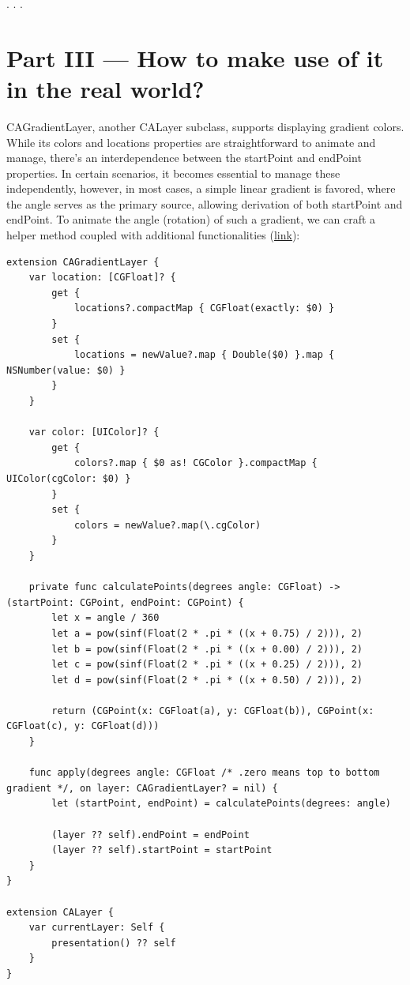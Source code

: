 \documentclass{article}
\newcommand{\separator}{\vspace{5mm}\centerline{. . .}\vspace{5mm}}
\begin{document}
\separator

\section{Part III — How to make use of it in the real world?}
\label{sec:part3}

CAGradientLayer, another CALayer subclass, supports displaying gradient colors. While its colors and locations properties are straightforward to animate and manage, there's an interdependence between the startPoint and endPoint properties. In certain scenarios, it becomes essential to manage these independently, however, in most cases, a simple linear gradient is favored, where the angle serves as the primary source, allowing derivation of both startPoint and endPoint. To animate the angle (rotation) of such a gradient, we can craft a helper method coupled with additional functionalities (\href{https://github.com/stateman92/Medium-AnimatableProperties/commit/bc084166a2b3561ae57c34aa416aa75ced12e745}{link}):

\begin{lstlisting}
extension CAGradientLayer {
    var location: [CGFloat]? {
        get {
            locations?.compactMap { CGFloat(exactly: $0) }
        }
        set {
            locations = newValue?.map { Double($0) }.map { NSNumber(value: $0) }
        }
    }

    var color: [UIColor]? {
        get {
            colors?.map { $0 as! CGColor }.compactMap { UIColor(cgColor: $0) }
        }
        set {
            colors = newValue?.map(\.cgColor)
        }
    }

    private func calculatePoints(degrees angle: CGFloat) -> (startPoint: CGPoint, endPoint: CGPoint) {
        let x = angle / 360
        let a = pow(sinf(Float(2 * .pi * ((x + 0.75) / 2))), 2)
        let b = pow(sinf(Float(2 * .pi * ((x + 0.00) / 2))), 2)
        let c = pow(sinf(Float(2 * .pi * ((x + 0.25) / 2))), 2)
        let d = pow(sinf(Float(2 * .pi * ((x + 0.50) / 2))), 2)

        return (CGPoint(x: CGFloat(a), y: CGFloat(b)), CGPoint(x: CGFloat(c), y: CGFloat(d)))
    }

    func apply(degrees angle: CGFloat /* .zero means top to bottom gradient */, on layer: CAGradientLayer? = nil) {
        let (startPoint, endPoint) = calculatePoints(degrees: angle)

        (layer ?? self).endPoint = endPoint
        (layer ?? self).startPoint = startPoint
    }
}

extension CALayer {
    var currentLayer: Self {
        presentation() ?? self
    }
}
\end{lstlisting}
\end{document}
